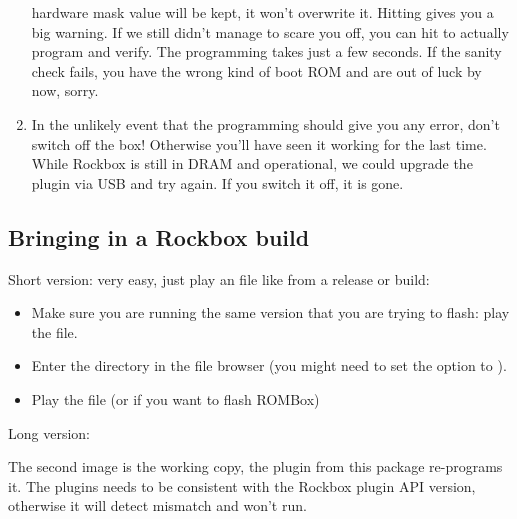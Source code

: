 \begin{enumerate}
  hardware mask value will be kept, it won't overwrite it. Hitting  gives you 
  a big warning. If we still didn't manage to scare you off, you can hit to actually program and verify. The programming takes just a few seconds. If 
  the sanity check fails, you have the wrong kind of boot ROM and are out of luck
  by now, sorry.
\item In the unlikely event that the programming should give you any error, don't
  switch off the box! Otherwise you'll have seen it working for the last time. 
  While Rockbox is still in DRAM and operational, we could upgrade the plugin via
  USB and try again. If you switch it off, it is gone.
\end{enumerate}



\subsection{Bringing in a Rockbox build}
Short version: very easy, just play an  file like 
 from a release or build:

\begin{itemize}
\item Make sure you are running the same version that you are trying to flash: 
  play the  file.
\item  Enter the  directory in the file browser (you might need 
  to set the  option to ).
\item Play the  file (or  if you want to 
  flash ROMBox)
\end{itemize}

Long version:

The second image is the working copy, the  plugin from
this package re-programs it. The plugins needs to be consistent with the Rockbox 
plugin API version, otherwise it will detect mismatch and won't run.

